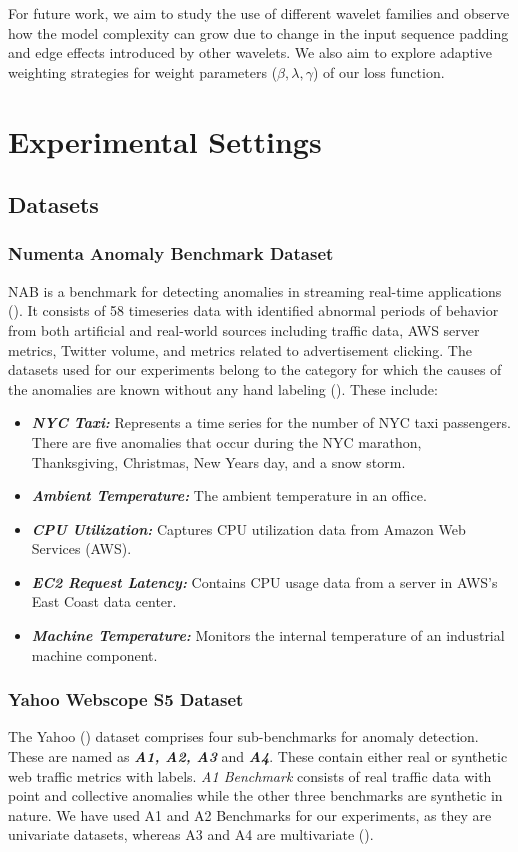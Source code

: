 For future work, we aim to study the use of different wavelet families and observe how the model complexity can grow due to change in the input sequence padding and edge effects introduced by other wavelets. We also aim to explore adaptive weighting strategies for weight parameters ($\beta,\lambda,\gamma$) of our loss function.



\section{Experimental Settings}
\label{sec:experiments}
\subsection{Datasets}
\subsubsection{Numenta Anomaly Benchmark Dataset}
NAB is a benchmark for detecting anomalies in streaming real-time applications (\cite{b2}). It consists of 58 timeseries data with identified abnormal periods of behavior from both artificial and real-world sources including traffic data, AWS server metrics, Twitter volume, and metrics related to advertisement clicking. The datasets used for our experiments belong to the category for which the causes of the anomalies are known without any hand labeling (\cite{tsvae}). These include:
\begin{itemize}
\item \emph{\bfseries NYC Taxi: } Represents a time series for the number of NYC taxi passengers. There are five anomalies that occur during the NYC marathon, Thanksgiving, Christmas, New Years day, and a snow storm.
\item \emph{\bfseries Ambient Temperature: } The ambient temperature in an office.
\item \emph{\bfseries CPU Utilization: } Captures CPU utilization data from Amazon Web Services (AWS).
\item \emph{\bfseries EC2 Request Latency: }Contains CPU usage data from a server in AWS’s East Coast data center.
\item \emph{\bfseries Machine Temperature: } Monitors the internal temperature of an industrial machine component. 
\end{itemize}
\subsubsection{Yahoo Webscope S5 Dataset} 
The Yahoo (\cite{yahoo}) dataset comprises four sub-benchmarks for anomaly detection. These are named as \emph{\bfseries A1, A2, A3} and \emph{\bfseries A4}. These contain either real or synthetic web traffic metrics with labels. \emph{A1 Benchmark} consists of real traffic data with point and collective anomalies while the other three benchmarks are synthetic in nature. We have used A1 and A2 Benchmarks for our experiments, as they are univariate datasets, whereas A3 and A4 are multivariate (\cite{cvae}).
 
